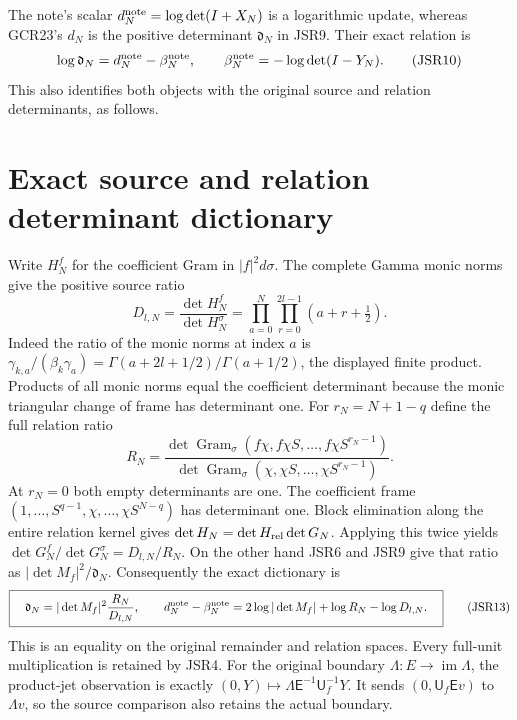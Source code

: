 \documentclass[11pt,a4paper]{article}
\begin{document}
The note's scalar $d_N^{\rm note}=\log\det(I+X_N)$ is
a logarithmic update, whereas GCR23's $d_N$ is the positive
determinant $\mathfrak d_N$ in JSR9. Their exact relation is
\[
 \log\mathfrak d_N=d_N^{\rm note}-\beta_N^{\rm note},
 \qquad\beta_N^{\rm note}=-\log\det(I-Y_N).
 \tag{JSR10}
\]
This also identifies both objects with the original source
and relation determinants, as follows.

\section{Exact source and relation determinant dictionary}

Write $H_N^f$ for the coefficient Gram in $|f|^2d\sigma$.
The complete Gamma monic norms give the positive source ratio
\[
 D_{l,N}=\frac{\det H_N^f}{\det H_N^\sigma}
     =\prod_{a=0}^N\prod_{r=0}^{2l-1}(a+r+\tfrac12).
 \tag{JSR11}
\]
Indeed the ratio of the monic norms at index $a$ is
$\gamma_{k,a}/(\beta_k\gamma_a)
=\Gamma(a+2l+1/2)/\Gamma(a+1/2)$, the displayed finite product.
Products of all monic norms equal the coefficient determinant
because the monic triangular change of frame has determinant one.
For $r_N=N+1-q$ define the full relation ratio
\[
 R_N=\frac{\det\operatorname{Gram}_\sigma
                 (f\chi,f\chi S,\ldots,f\chi S^{r_N-1})}
             {\det\operatorname{Gram}_\sigma
                 (\chi,\chi S,\ldots,\chi S^{r_N-1})}.
 \tag{JSR12}
\]
At $r_N=0$ both empty determinants are one.
The coefficient frame
$(1,\ldots,S^{q-1},\chi,\ldots,\chi S^{N-q})$
has determinant one. Block elimination along the entire
relation kernel gives $\det H_N=\det H_{\rm rel}\det G_N$.
Applying this twice yields
$\det G_N^f/\det G_N^\sigma=D_{l,N}/R_N$.
On the other hand JSR6 and JSR9 give that ratio as
$|\det M_f|^2/\mathfrak d_N$. Consequently the exact
dictionary is
\[
 \boxed{\quad
 \mathfrak d_N=|\det M_f|^2\frac{R_N}{D_{l,N}},\qquad
 d_N^{\rm note}-\beta_N^{\rm note}
 =2\log|\det M_f|+\log R_N-\log D_{l,N}.
 \quad}\tag{JSR13}
\]
This is an equality on the original remainder and relation
spaces. Every full-unit multiplication is retained by JSR4.
For the original boundary $\Lambda:E\to\operatorname{im}\Lambda$,
the product-jet observation is exactly
$(0,Y)\mapsto\Lambda\mathsf E^{-1}\mathsf U_f^{-1}Y$.
It sends $(0,\mathsf U_f\mathsf E v)$ to $\Lambda v$,
so the source comparison also retains the actual boundary.
\end{document}
